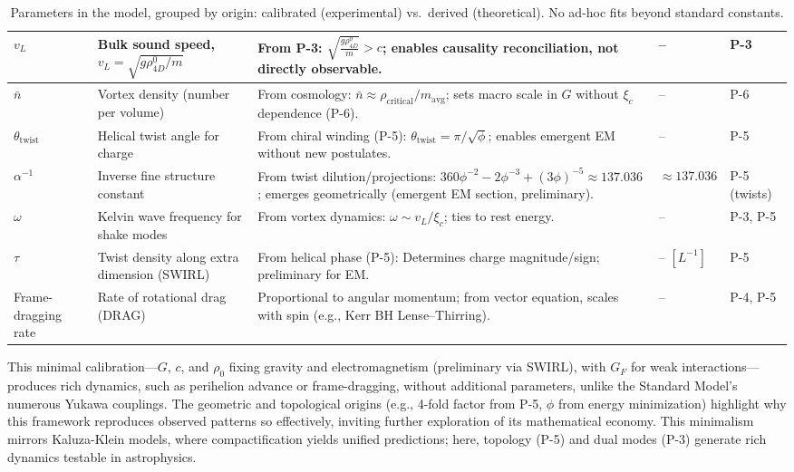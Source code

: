 \begin{table}[H]
\begin{tabularx}{\linewidth}{|p{1.5cm}|p{3cm}|X|p{2cm}|p{2cm}|}
\hline
$v_L$ & Bulk sound speed, $v_L = \sqrt{g \rho_{4D}^0 / m}$ & From P-3: $\sqrt{\frac{g \rho_{4D}^0}{m}} > c$; enables causality reconciliation, not directly observable. & -- & P-3 \\
\hline
$\bar{n}$ & Vortex density (number per volume) & From cosmology: $\bar{n} \approx \rho_{\text{critical}} / m_{\text{avg}}$; sets macro scale in $G$ without $\xi_c$ dependence (P-6). & -- & P-6 \\
\hline
$\theta_{\text{twist}}$ & Helical twist angle for charge & From chiral winding (P-5): $\theta_{\text{twist}} = \pi / \sqrt{\phi}$; enables emergent EM without new postulates. & -- & P-5 \\
\hline
$\alpha^{-1}$ & Inverse fine structure constant & From twist dilution/projections: $360 \phi^{-2} - 2 \phi^{-3} + (3 \phi)^{-5} \approx 137.036$; emerges geometrically (emergent EM section, preliminary). & $\approx 137.036$ & P-5 (twists) \\
\hline
$\omega$ & Kelvin wave frequency for shake modes & From vortex dynamics: $\omega \sim v_L / \xi_c$; ties to rest energy. & -- & P-3, P-5 \\
\hline
$\tau$ & Twist density along extra dimension (SWIRL) & From helical phase (P-5): Determines charge magnitude/sign; preliminary for EM. & -- $[L^{-1}]$ & P-5 \\
\hline
Frame-dragging rate & Rate of rotational drag (DRAG) & Proportional to angular momentum; from vector equation, scales with spin (e.g., Kerr BH Lense–Thirring). & -- & P-4, P-5 \\
\hline
\end{tabularx}
\caption{Parameters in the model, grouped by origin: calibrated (experimental) vs.\ derived (theoretical). No ad-hoc fits beyond standard constants.}
\label{tab:parameters}
\end{table}

This minimal calibration---$G$, $c$, and $\rho_0$ fixing gravity and electromagnetism (preliminary via SWIRL), with $G_F$ for weak interactions---produces rich dynamics, such as perihelion advance or frame-dragging, without additional parameters, unlike the Standard Model's numerous Yukawa couplings. The geometric and topological origins (e.g., 4-fold factor from P-5, $\phi$ from energy minimization) highlight why this framework reproduces observed patterns so effectively, inviting further exploration of its mathematical economy. This minimalism mirrors Kaluza-Klein models, where compactification yields unified predictions; here, topology (P-5) and dual modes (P-3) generate rich dynamics testable in astrophysics.


